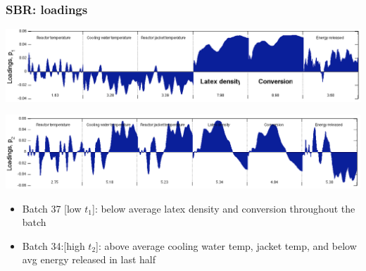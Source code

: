 \begin{frame}\frametitle{SBR: loadings}
	
	\begin{center}
		\includegraphics[width=\textwidth]{images/sbr/SBR-loadings-p1.png}
	\end{center}
	\begin{center}
		\includegraphics[width=\textwidth]{images/sbr/SBR-loadings-p2.png}
	\end{center}
	
	\begin{itemize}
		\item	Batch 37 [low \( t_1 \)]: below average latex density and conversion throughout the batch
		
		\item	Batch 34:[high \( t_2 \)]: above average cooling water temp, jacket temp, and below avg energy released in last half
		
	\end{itemize}
\end{frame}
 
